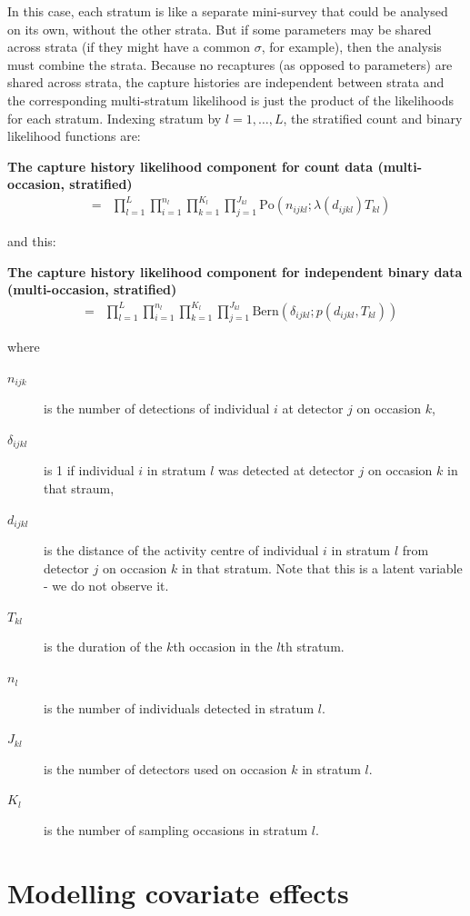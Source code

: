 \documentclass[graybox,envcountchap,sectrefs]{SpringerStyleFiles/styles/svmono}\usepackage[]{graphicx}\usepackage[]{color}
\newcommand{\be}{\begin{eqnarray}}
\newcommand{\ee}{\end{eqnarray}}
\newcommand{\bd}{\begin{description}}
\newcommand{\ed}{\end{description}}
\begin{document}
In this case, each stratum is like a separate mini-survey that could be analysed on its own, without the other strata. But if some parameters may be shared across strata (if they might have a common $\sigma$, for example), then the analysis must combine the strata. Because no recaptures (as opposed to parameters) are shared across strata, the capture histories are independent between strata and the corresponding multi-stratum likelihood is just the product of the likelihoods for each stratum. Indexing stratum by $l=1,\ldots,L$, the stratified count and binary likelihood functions are:
\begin{svgraybox}
\bf{The capture history likelihood component for count data (multi-occasion, stratified)}
\be
[\bm{\Omega}_n|\bm{S}_n]&=&\prod_{l=1}^L\prod_{i=1}^{n_l}\prod_{k=1}^{K_l}\prod_{j=1}^{J_{kl}}\mbox{Po}\left(n_{ijkl};\lambda(d_{ijkl})T_{kl}\right)
\label{eq:ER+detfun.P.Omega.count.occ.strat}
\ee
\end{svgraybox}
and this:
\begin{svgraybox}
\bf{The capture history likelihood component for independent binary data (multi-occasion, stratified)}
\be
[\bm{\Omega}_n|\bm{S}_n]&=&\prod_{l=1}^L\prod_{i=1}^{n_l}\prod_{k=1}^{K_l}\prod_{j=1}^{J_{kl}}\mbox{Bern}\left(\delta_{ijkl};p(d_{ijkl},T_{kl})\right)
\label{eq:ER+detfun.P.Omega.binary.occ.strat}
\ee
\end{svgraybox}
\noindent
where
\begin{svgraybox}
\bd
\item[$n_{ijk}$] is the number of detections of individual $i$ at detector $j$ on occasion $k$,
\item[$\delta_{ijkl}$] is 1 if individual $i$ in stratum $l$ was detected at detector $j$ on occasion $k$ in that straum,
\item[$d_{ijkl}$] is the distance of the activity centre of individual $i$ in stratum $l$ from detector $j$ on occasion $k$ in that stratum. Note that this is a latent variable - we do not observe it.
\item[$T_{kl}$] is the duration of the $k$th occasion in the $l$th stratum.
\item[$n_l$] is the number of individuals detected in stratum $l$.
\item[$J_{kl}$] is the number of detectors used on occasion $k$ in stratum $l$.
\item[$K_l$] is the number of sampling occasions in stratum $l$.
\ed
\end{svgraybox}

\section{Modelling covariate effects}
\end{document}

